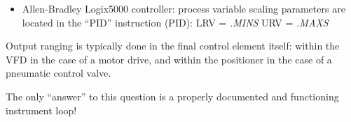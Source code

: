 \begin{itemize}
\itemitem{} (SCL instruction) = {\it Rate} and {\it Offset} values scale the signal according to the slope-intercept formula $y = mx + b$, where {\it Rate} is $10000 m$ and {\it Offset} is $b$
\itemitem{} (SCP instruction LRV) = {\it Scaled Min.}
\itemitem{} (SCP instruction URV) = {\it Scaled Max.}
\vskip 10pt
\item{} Allen-Bradley Logix5000 controller: process variable scaling parameters are located in the ``PID'' instruction (PID):
\itemitem{} LRV = {\it .MINS}
\itemitem{} URV = {\it .MAXS}
\end{itemize}

\vskip 10pt

Output ranging is typically done in the final control element itself: within the VFD in the case of a motor drive, and within the positioner in the case of a pneumatic control valve.










The only ``answer'' to this question is a properly documented and functioning instrument loop!











